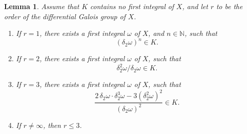 \documentclass[preprint, 12pt]{elsarticle}
\newtheorem{lem}[thm]{Lemma}
\numberwithin{equation}{section}
\begin{document}
\begin{lem}
\label{lem:a.7} Assume that $K$ contains no first integral of $X$,
and let $r$ to be the order of the differential Galois group of
$X$.
\begin{enumerate}
\item[(1).] If $r = 1$, there exists a first integral $\omega$ of
$X$, and $n\in \mathbb{N}$, such that
$$(\delta_2\omega)^n\in K.$$
 \item[(2).] If $r = 2$, there exists a first integral $\omega$ of $X$, such that
 $$\delta_2^2\omega/\delta_2\omega\in K.$$
\item[(3).] If $r = 3$, there exists a first integral $\omega$ of
$X$, such that
$$\dfrac{2\,\delta_2\omega\cdot\delta_2^3\omega - 3(\delta_2^2\omega)^2}{(\delta_2\omega)^2}\in K.$$
\item[(4).] If $r\not=\infty$, then $r\leq 3$.
\end{enumerate}
\end{lem}
\end{document}
